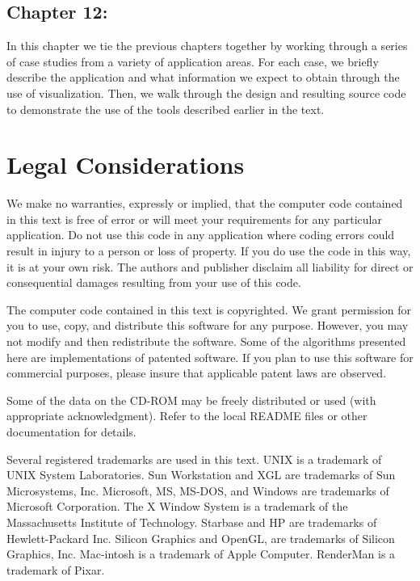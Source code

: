 \subsection*{Chapter 12: }

In this chapter we tie the previous chapters together by working through a series of case studies from a variety of application areas. For each case, we briefly describe the application and what information we expect to obtain through the use of visualization. Then, we walk through the design and resulting source code to demonstrate the use of the tools described earlier in the text.

\section{Legal Considerations}

We make no warranties, expressly or implied, that the computer code contained in this text is free of error or will meet your requirements for any particular application. Do not use this code in any application where coding errors could result in injury to a person or loss of property. If you do use the code in this way, it is at your own risk. The authors and publisher disclaim all liability for direct or consequential damages resulting from your use of this code.

The computer code contained in this text is copyrighted. We grant permission for you to use, copy, and distribute this software for any purpose. However, you may not modify and then redistribute the software. Some of the algorithms presented here are implementations of patented software. If you plan to use this software for commercial purposes, please insure that applicable patent laws are observed.

Some of the data on the CD-ROM may be freely distributed or used (with appropriate acknowledgment). Refer to the local README files or other documentation for details.

Several registered trademarks are used in this text. UNIX is a trademark of UNIX System Laboratories. Sun Workstation and XGL are trademarks of Sun Microsystems, Inc. Microsoft, MS, MS-DOS, and Windows are trademarks of Microsoft Corporation. The X Window System is a trademark of the Massachusetts Institute of Technology. Starbase and HP are trademarks of Hewlett-Packard Inc. Silicon Graphics and OpenGL, are trademarks of Silicon Graphics, Inc. Mac-intosh is a trademark of Apple Computer. RenderMan is a trademark of Pixar.
